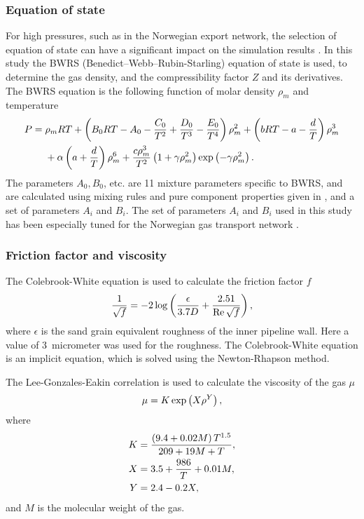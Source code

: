 \subsubsection{Equation of state}
For high pressures, such as in the Norwegian export network, the selection of equation of state can have a significant impact on the simulation results \cite{Helgaker2014Validation,Chaczykowski2009Sensitivity}. In this study the BWRS (Benedict–Webb–Rubin-Starling) equation of state \cite{Starling1973Fluid} is used, to determine the gas density, and the compressibility factor $Z$ and its derivatives. The BWRS equation is the following function of molar density $\rho_m$ and temperature
\begin{align}
\begin{split}
    P ={} &\rho_m RT 
    + \del{B_0 RT - A_0 - \frac{C_0}{T^2} + \frac{D_0}{T^3} - \frac{E_0}{T^4}}\rho_m^2 
    + \del{bRT - a - \frac{d}{T}}\rho_m^3 
    \\&
    + \alpha \del{a + \frac{d}{T}}\rho_m^6 
    + \frac{c\rho_m^3}{T^2}\del{1 + \gamma \rho_m^2} \exp\del{-\gamma \rho_m^2}
.
\end{split}
\end{align}
The parameters $A_0, B_0$, etc. are 11 mixture parameters specific to BWRS, and are calculated using mixing rules and pure component properties given in \cite{Starling1973Fluid}, and a set of parameters $A_i$ and $B_i$. %
The set of parameters $A_i$ and $B_i$ used in this study has been especially tuned for the Norwegian gas transport network \cite{Calsep}.

\subsubsection{Friction factor and viscosity}
The Colebrook-White equation \cite{Colebrook1939Turbulent} is used to calculate the friction factor $f$
\begin{align}
    \frac{1}{\sqrt{f}} = -2\log \del{\frac{\epsilon}{3.7 D} + \frac{2.51}{\Reyn \sqrt{f}}}
    \label{eq:colebrookWhite}
,
\end{align}
where $\epsilon$ is the sand grain equivalent roughness of the inner pipeline wall. Here a value of 3~micrometer was used for the roughness. The Colebrook-White equation is an implicit equation, which is solved using the Newton-Rhapson method. 

The Lee-Gonzales-Eakin correlation \cite{Lee1966Viscosity} is used to calculate the viscosity of the gas $\mu$
\begin{align}
    \mu = K\exp\del{X\rho^Y},
\label{eq:LGE}
\end{align}
where
\begin{align}
    K &= \frac{\del{9.4+0.02M} T^{1.5}}{209 + 19 M + T}, \\
    X &= 3.5 + \frac{986}{T} + 0.01 M, \\
    Y &= 2.4 - 0.2X
,
\end{align}
and $M$ is the molecular weight of the gas.